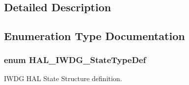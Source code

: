 \subsection{Detailed Description}


\subsection{Enumeration Type Documentation}
\subsubsection[{\texorpdfstring{H\+A\+L\+\_\+\+I\+W\+D\+G\+\_\+\+State\+Type\+Def}{HAL_IWDG_StateTypeDef}}]{\setlength{\rightskip}{0pt plus 5cm}enum {\bf H\+A\+L\+\_\+\+I\+W\+D\+G\+\_\+\+State\+Type\+Def}}\hypertarget{group___i_w_d_g___exported___types_ga61699dc6f24a3edecddd16018560d0e5}{}\label{group___i_w_d_g___exported___types_ga61699dc6f24a3edecddd16018560d0e5}


I\+W\+DG H\+AL State Structure definition. 


